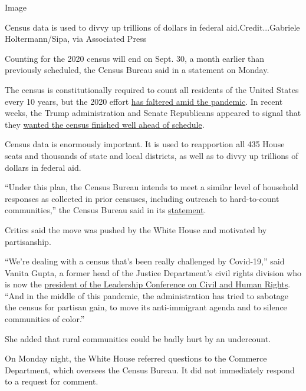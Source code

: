 Image

Census data is used to divvy up trillions of dollars in federal
aid.Credit...Gabriele Holtermann/Sipa, via Associated Press

Counting for the 2020 census will end on Sept. 30, a month earlier than
previously scheduled, the Census Bureau said in a statement on Monday.

The census is constitutionally required to count all residents of the
United States every 10 years, but the 2020 effort
\href{https://www.nytimes.com/2020/04/18/us/coronavirus-census.html}{has
faltered amid the pandemic}. In recent weeks, the Trump administration
and Senate Republicans appeared to signal that they
\href{https://www.nytimes.com/2020/07/28/us/trump-census.html}{wanted
the census finished well ahead of schedule}.

Census data is enormously important. It is used to reapportion all 435
House seats and thousands of state and local districts, as well as to
divvy up trillions of dollars in federal aid.

``Under this plan, the Census Bureau intends to meet a similar level of
household responses as collected in prior censuses, including outreach
to hard-to-count communities,'' the Census Bureau said in its
\href{https://www.census.gov/newsroom/press-releases/2020/delivering-complete-accurate-count.html}{statement}.

Critics said the move was pushed by the White House and motivated by
partisanship.

``We're dealing with a census that's been really challenged by
Covid-19,'' said Vanita Gupta, a former head of the Justice Department's
civil rights division who is now the
\href{https://civilrights.org/about/our-staff/vanita-gupta/}{president
of the Leadership Conference on Civil and Human Rights}. ``And in the
middle of this pandemic, the administration has tried to sabotage the
census for partisan gain, to move its anti-immigrant agenda and to
silence communities of color.''

She added that rural communities could be badly hurt by an undercount.

On Monday night, the White House referred questions to the Commerce
Department, which oversees the Census Bureau. It did not immediately
respond to a request for comment.

\hypertarget{-11}{%
\subsection{}\label{-11}}


